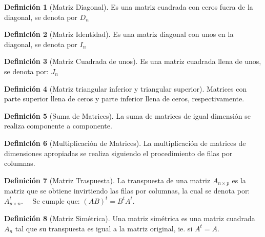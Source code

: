 \documentclass[
]{book}
\theoremstyle{definition}
\newtheorem{definition}{Definición}[chapter]
\theoremstyle{definition}
\theoremstyle{definition}
\theoremstyle{definition}
\theoremstyle{remark}
\begin{document}
\begin{definition}[Matriz Diagonal]
\protect\hypertarget{def:matriz-diag}{}\label{def:matriz-diag}Es una matriz cuadrada con ceros fuera de la diagonal, se denota por \(D_n\)
\end{definition}

\begin{definition}[Matriz Identidad]
\protect\hypertarget{def:matriz-ident}{}\label{def:matriz-ident}Es una matriz diagonal con unos en la diagonal, se denota por \(I_n\)
\end{definition}

\begin{definition}[Matriz Cuadrada de unos]
\protect\hypertarget{def:matriz-unos}{}\label{def:matriz-unos}Es una matriz cuadrada llena de unos, se denota por: \(J_n\)
\end{definition}

\begin{definition}[Matriz triangular inferior y triangular superior]
\protect\hypertarget{def:matriz-trinagular}{}\label{def:matriz-trinagular}Matrices con parte superior llena de ceros y parte inferior llena de ceros, respectivamente.
\end{definition}

\begin{definition}[Suma de Matrices]
\protect\hypertarget{def:suma-matrices}{}\label{def:suma-matrices}La suma de matrices de igual dimensión se realiza componente a componente.
\end{definition}

\begin{definition}[Multiplicación de Matrices]
\protect\hypertarget{def:multip-matrices}{}\label{def:multip-matrices}La multiplicación de matrices de dimensiones apropiadas se realiza siguiendo el procedimiento de filas por columnas.
\end{definition}

\begin{definition}[Matriz Traspuesta]
\protect\hypertarget{def:matriz-traspuesta}{}\label{def:matriz-traspuesta}La transpuesta de una matriz \(A_{n \times p}\) es la matriz que se obtiene invirtiendo las filas por columnas, la cual se denota por: \(A_{p \times n}^t\).~~ Se cumple que: \((AB)^t=B^tA^t\).
\end{definition}

\begin{definition}[Matriz Simétrica]
\protect\hypertarget{def:matriz-simetrica}{}\label{def:matriz-simetrica}Una matriz simétrica es una matriz cuadrada \(A_n\) tal que su transpuesta es igual a la matriz original, ie. si \(A^t=A\).
\end{definition}
\end{document}
